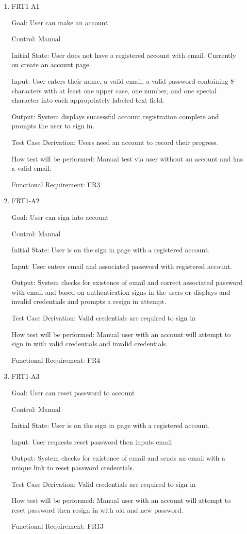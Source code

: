 \documentclass[12pt, titlepage]{article}
\begin{document}
\begin{enumerate}

\item{FRT1-A1}

Goal: User can make an account

Control: Manual
					
Initial State: User does not have a registered account with email. Currently on create an account page.
					
Input: User enters their name, a valid email, a valid password containing 8 characters with at least one upper case, one number, and one special character into each appropriately labeled text field.
					
Output: System displays successful account registration complete and prompts the user to sign in.

Test Case Derivation: Users need an account to record their progress.
					
How test will be performed: Manual test via user without an account and has a valid email.

Functional Requirement: FR3

\item{FRT1-A2}

Goal: User can sign into account

Control: Manual
					
Initial State: User is on the sign in page with a registered account.
					
Input: User enters email and associated password with registered account.
					
Output: System checks for existence of email and correct associated password with email and based on authentication signs in the users or displays and invalid credentials and prompts a resign in attempt.

Test Case Derivation: Valid credentials are required to sign in

How test will be performed: Manual user with an account will attempt to sign in with valid credentials and invalid credentials.

Functional Requirement: FR4

\item{FRT1-A3}

Goal: User can reset password to account

Control: Manual
					
Initial State: User is on the sign in page with a registered account.
					
Input: User requests reset password then inputs email
					
Output: System checks for existence of email and sends an email with a unique link to reset password credentials.

Test Case Derivation: Valid credentials are required to sign in

How test will be performed: Manual user with an account will attempt to reset password then resign in with old and new password.

Functional Requirement: FR13

\end{enumerate}
\end{document}
